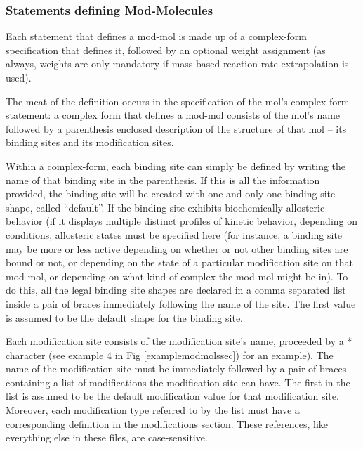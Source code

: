 \subsubsection{Statements defining Mod-Molecules}
Each statement that defines a mod-mol is made up of a complex-form
specification that defines it, followed by an optional weight
assignment (as always, weights are only mandatory if mass-based
reaction rate extrapolation is used).

The meat of the definition occurs in the specification of the mol's
complex-form statement: a complex form that defines a mod-mol consists
of the mol's name followed by a parenthesis enclosed description of the
structure of that mol -- its binding sites and its modification sites.

Within a complex-form, each binding site can simply be defined by
writing the name of that binding site in the parenthesis.  If this is
all the information provided, the binding site will be created with
one and only one binding site shape, called ``default''.  If the
binding site exhibits biochemically allosteric behavior (if it
displays multiple distinct profiles of kinetic behavior, depending on
conditions, allosteric states must be specified here (for instance, a
binding site may be more or less active depending on whether or not
other binding sites are bound or not, or depending on the state of a
particular modification site on that mod-mol, or depending on what
kind of complex the mod-mol might be in).  To do this, all the legal
binding site shapes are declared in a comma separated list inside a
pair of braces immediately following the name of the site.  The first
value is assumed to be the default shape for the binding site.

Each modification site consists of the modification site's name,
proceeded by a * character (see example 4 in Fig
\ref{examplemodmolssec}) for an example).  The name of the
modification site must be immediately followed by a pair of braces
containing a list of modifications the modification site can have.
The first in the list is assumed to be the default modification value
for that modification site.  Moreover, each modification type referred
to by the list must have a corresponding definition in the
modifications section.  These references, like everything else in
these files, are case-sensitive.

